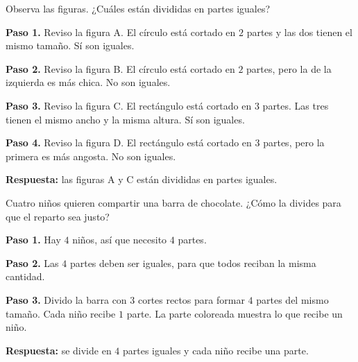 \begin{wbexample}
Observa las figuras. ¿Cuáles están divididas en partes iguales?

\begin{center}
\end{center}

\textbf{Paso 1.} Reviso la figura A. El círculo está cortado en $2$ partes y las dos tienen el mismo tamaño. Sí son iguales.

\textbf{Paso 2.} Reviso la figura B. El círculo está cortado en $2$ partes, pero la de la izquierda es más chica. No son iguales.

\textbf{Paso 3.} Reviso la figura C. El rectángulo está cortado en $3$ partes. Las tres tienen el mismo ancho y la misma altura. Sí son iguales.

\textbf{Paso 4.} Reviso la figura D. El rectángulo está cortado en $3$ partes, pero la primera es más angosta. No son iguales.

\textbf{Respuesta:} las figuras A y C están divididas en partes iguales.
\end{wbexample}

\begin{wbexample}
Cuatro niños quieren compartir una barra de chocolate. ¿Cómo la divides para que el reparto sea justo?

\textbf{Paso 1.} Hay $4$ niños, así que necesito $4$ partes.

\textbf{Paso 2.} Las $4$ partes deben ser iguales, para que todos reciban la misma cantidad.

\textbf{Paso 3.} Divido la barra con $3$ cortes rectos para formar $4$ partes del mismo tamaño. Cada niño recibe $1$ parte. La parte coloreada muestra lo que recibe un niño.

\begin{center}
\end{center}

\textbf{Respuesta:} se divide en $4$ partes iguales y cada niño recibe una parte.
\end{wbexample}

